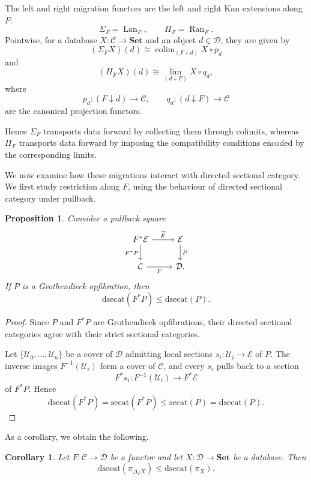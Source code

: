 \documentclass[12pt]{amsart}
\newtheorem{corollary}[teo]{Corollary}
\newtheorem{prop}[teo]{Proposition}
\theoremstyle{definition}
\theoremstyle{remark}
\numberwithin{figure}{section}%
\newcommand{\CC}{\mathcal{C}}
\newcommand{\Dc}{\mathcal{D}}
\newcommand{\E}{\mathcal{E}}
\newcommand{\Sets}{\mathbf{Set}}
\newcommand{\Uc}{\mathcal{U}}
\begin{document}
The left and right migration functors are the left and right Kan
extensions along \(F\):
\[
\Sigma_F=\operatorname{Lan}_F,
\qquad
\Pi_F=\operatorname{Ran}_F.
\]
Pointwise, for a database \(X\colon\CC\to\Sets\) and an object
\(d\in\Dc\), they are given by
\[
(\Sigma_FX)(d)
\cong
\mathop{\operatorname{colim}}_{(F\downarrow d)}X\circ p_d
\]
and
\[
(\Pi_FX)(d)
\cong
\mathop{\operatorname{lim}}_{(d\downarrow F)}X\circ q_d,
\]
where
\[
p_d\colon(F\downarrow d)\longrightarrow\CC,
\qquad
q_d\colon(d\downarrow F)\longrightarrow\CC
\]
are the canonical projection functors.

Hence \(\Sigma_F\) transports data forward by collecting them through
colimits, whereas \(\Pi_F\) transports data forward by imposing the
compatibility conditions encoded by the corresponding limits. 

We now examine how these migrations interact with directed sectional
category. We first study restriction along \(F\), using the behaviour of directed sectional category under pullback.

\begin{prop}\label{prop:dsecat_base_change}
Consider a pullback square
\[
\begin{tikzcd}
F^\ast\E
  \arrow[r, "\widetilde F"]
  \arrow[d, "F^\ast P"']
&
\E
  \arrow[d, "P"]
\\
\CC
  \arrow[r, "F"']
&
\Dc .
\end{tikzcd}
\]
If \(P\) is a Grothendieck opfibration, then
\[
\mathrm{dsecat}(F^\ast P)
\leq
\mathrm{dsecat}(P).
\]
\end{prop}

\begin{proof}
Since \(P\) and \(F^\ast P\) are Grothendieck opfibrations, their directed
sectional categories agree with their strict sectional categories.

Let \(\{\Uc_0,\ldots,\Uc_n\}\) be a cover of \(\Dc\) admitting local
sections \(s_i\colon\Uc_i\to\E\) of \(P\). The inverse images
\(F^{-1}(\Uc_i)\) form a cover of \(\CC\), and every \(s_i\) pulls back to
a section
\[
F^\ast s_i\colon F^{-1}(\Uc_i)\longrightarrow F^\ast\E
\]
of \(F^\ast P\). Hence
\[
\mathrm{dsecat}(F^\ast P)
=
\mathrm{secat}(F^\ast P)
\leq
\mathrm{secat}(P)
=
\mathrm{dsecat}(P).
\]
\end{proof}

As a corollary, we obtain the following.\begin{corollary}\label{cor:dsecat_delta_migration}
Let \(F\colon\CC\to\Dc\) be a functor and let
\(X\colon\Dc\to\Sets\) be a database. Then
\[
\mathrm{dsecat}(\pi_{\Delta_FX})
\leq
\mathrm{dsecat}(\pi_X).
\]
\end{corollary}
\end{document}
